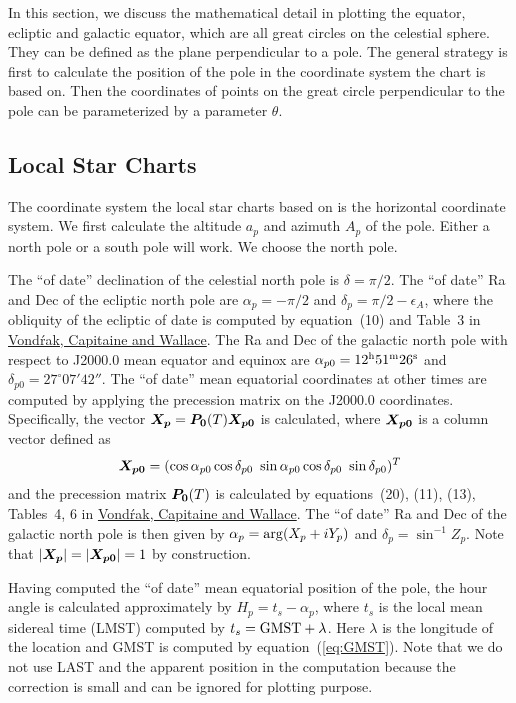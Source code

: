 \documentclass[12pt]{article}
\newcommand \beq {\begin{equation}}
\newcommand \eeq {\end{equation}}
\newcommand{\ve}[1]{\mbox{\boldmath $#1$}}
\begin{document}
In this section, we discuss the mathematical detail in plotting the 
equator, ecliptic and galactic equator, which are all great circles on 
the celestial sphere. They can be defined as the plane perpendicular to 
a pole. The general strategy is first to calculate the position of the pole 
in the coordinate system the chart is based on. Then the coordinates of points 
on the great circle perpendicular to the pole can be parameterized by a parameter 
$\theta$.

\subsection{Local Star Charts} 

The coordinate system the local star charts based on is the horizontal 
coordinate system. We first calculate the altitude $a_p$ and azimuth $A_p$ 
of the pole. Either a north pole or a south pole will work. We choose the 
north pole. 

The ``of date'' declination of the celestial north pole is $\delta=\pi/2$. 
The ``of date'' Ra and Dec of the ecliptic north pole are $\alpha_p=-\pi/2$ and 
$\delta_p = \pi/2-\epsilon_A$, where the obliquity of the ecliptic of date 
is computed by equation~(10) and Table~3 in
\href{http://adsabs.harvard.edu/abs/2011A%26A...534A..22V}{Vond\'rak,
Capitaine and Wallace}. 
The Ra and Dec of the galactic north pole with respect to J2000.0 mean equator 
and equinox are $\alpha_{p0} = 12^{\rm h} 51^{\rm m} 26^{\rm s}$ and 
$\delta_{p0} = 27^\circ 07' 42''$. The ``of date'' mean equatorial coordinates 
at other times are computed
by applying the precession matrix on the J2000.0 coordinates. Specifically, 
the vector $\ve{X_p}=\ve{P_0}(T) \ve{X_{p0}}$ is calculated, where $\ve{X_{p0}}$ is 
a column vector defined as 
\beq
  \ve{X_{p0}}=(\cos \alpha_{p0} \cos \delta_{p0}\ \sin \alpha_{p0} \cos \delta_{p0} \ 
\sin \delta_{p0})^T
\eeq
and the precession matrix $\ve{P_0}(T)$ is calculated by 
equations~(20), (11), (13), Tables~4, 6 in 
\href{http://adsabs.harvard.edu/abs/2011A%26A...534A..22V}{Vond\'rak, Capitaine and Wallace}. 
The ``of date'' Ra and Dec of the galactic north pole is then given by 
$\alpha_p = {\rm arg}(X_p+iY_p)$ and $\delta_p = \sin^{-1} Z_p$. 
Note that $|\ve{X_p}|=|\ve{X_{p0}}|=1$ by construction.

Having computed the ``of date'' mean equatorial position of the pole, the hour angle 
is calculated approximately by $H_p=t_s - \alpha_p$, where $t_s$ is the local mean 
sidereal time (LMST) computed by $t_s = {\rm GMST}+\lambda$. 
Here $\lambda$ is the longitude of the location and GMST is computed
by equation~(\ref{eq:GMST}). Note that we do not
use LAST and the apparent position in the computation because the correction is
small and can be ignored for plotting purpose.
\end{document}
